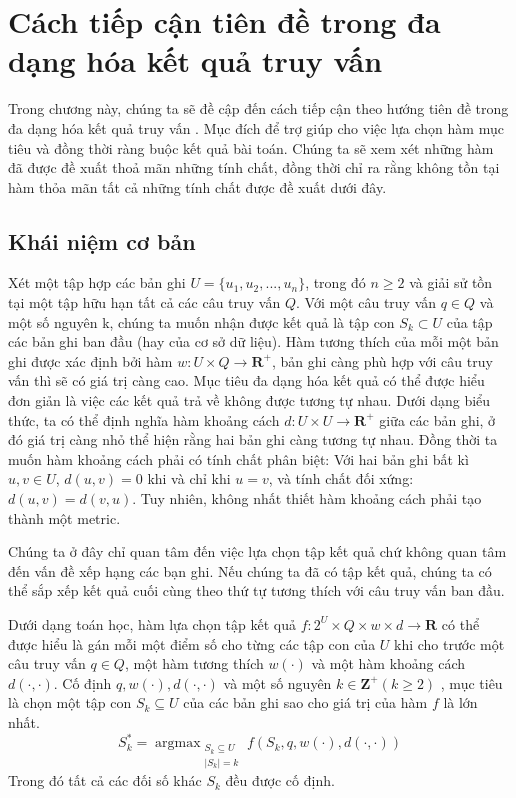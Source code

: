 \documentclass[12pt]{report}
\DeclareMathOperator*{\argmax}{argmax}
\begin{document}
\section{Cách tiếp cận tiên đề trong đa dạng hóa kết quả truy vấn}
Trong chương này, chúng ta sẽ đề cập đến cách tiếp cận 
theo hướng tiên đề trong đa dạng hóa kết quả truy vấn \cite{diversification}. 
Mục đích để trợ giúp cho việc lựa chọn hàm mục tiêu và đồng thời 
ràng buộc kết quả bài toán.
Chúng ta sẽ xem xét những hàm đã được đề xuất thoả mãn những tính chất, đồng thời chỉ ra rằng không tồn tại hàm thỏa mãn tất cả những tính chất được đề xuất dưới đây. 
\subsection{Khái niệm cơ bản}
Xét một tập hợp các bản ghi $U=\{u_1, u_2, ..., u_n\}$, trong đó $n \geq 2$
và giải sử tồn tại một tập hữu hạn tất cả các câu truy vấn $Q$. 
Với một câu truy vấn $q \in Q$ và một số nguyên k, chúng ta muốn nhận được kết quả là tập con $S_k \subset U$ của tập các bản ghi ban đầu (hay của cơ sở dữ liệu). 
Hàm tương thích của mỗi một bản ghi được xác định bởi hàm 
$w: U \times Q \to \mathbf{R}^+$, bản ghi càng phù hợp với câu truy vấn 
thì sẽ có giá trị càng cao. Mục tiêu đa dạng hóa kết quả có thể được hiểu đơn giản là việc các kết quả trả về không được tương tự nhau. Dưới dạng biểu thức, ta có thể định nghĩa hàm khoảng cách $d: U \times U \to \mathbf{R}^+$ giữa các bản ghi, ở đó giá trị càng nhỏ thể hiện rằng hai bản ghi càng tương tự nhau. Đồng thời ta muốn hàm khoảng cách phải có tính chất phân biệt: Với hai bản ghi bất kì $u, v \in U$, $d(u, v) = 0$ khi và chỉ khi $u = v$, và tính chất đối xứng: $d(u, v) = d(v, u)$. Tuy nhiên, không nhất thiết hàm khoảng cách phải tạo thành một metric. 

Chúng ta ở đây chỉ quan tâm đến việc lựa chọn tập kết quả chứ không quan tâm đến vấn đề xếp hạng các bạn ghi. Nếu chúng ta đã có tập kết quả, chúng ta có thể sắp xếp kết quả cuối cùng theo thứ tự tương thích với câu truy vấn ban đầu. 

Dưới dạng toán học, hàm lựa chọn tập kết quả $f: 2^U \times Q \times w \times d \to \mathbf{R}$ có thể được hiểu là gán mỗi một điểm số cho từng các tập con của $U$ khi cho trước một câu truy vấn $q \in Q$, một hàm tương 
thích $w(\cdot)$ và một hàm khoảng cách $d(\cdot, \cdot)$.
Cố định $q, w(\cdot), d(\cdot, \cdot)$ và một số nguyên $k \in \mathbf{Z}^+ (k \geq 2)$
, mục tiêu là chọn một tập con $S_k \subseteq U$ của các bản ghi sao cho giá trị của hàm $f$ là lớn nhất. 
$$S^*_k = \argmax_{\substack{S_k \subseteq U \\ |S_k| = k}}
f(S_k, q, w(\cdot), d(\cdot, \cdot)) $$
Trong đó tất cả các đối số khác $S_k$ đều được cố định. 
\end{document}
